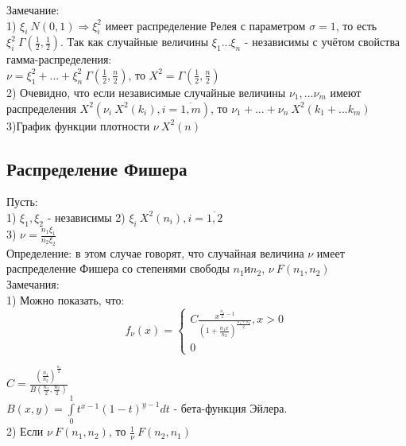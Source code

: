 Замечание:\\
1)  $\xi_{i} ~ N(0, 1) \Rightarrow \xi^{2}_{i}$ имеет распределение Релея с параметром $\sigma = 1$, то есть $\xi^{2}_{i} ~ \Gamma(\frac{1}{2}, \frac{1}{2})$. Так как случайные величины $\xi_{1} ... \xi_{n}$ - независимы с учётом свойства гамма-распределения:\\
$\nu = \xi_{1}^{2} + ... + \xi^{2}_{n} ~ \Gamma(\frac{1}{2}, \frac{n}{2})$, то $X^{2} = \Gamma(\frac{1}{2}, \frac{n}{2})$\\
2) Очевидно, что если независимые случайные величины $\nu_{1}, ... \nu_{m}$ имеют распределения $X^{2} (\nu_{i} ~ X^{2} (k_{i}), i=\overline{1, m})$, то $\nu_{1} + ... + \nu_{n} ~ X^{2}(k_{1} + ... k_{m})$\\
3)График функции плотности $\nu ~ X^{2}(n)$\\
\begin{figure}[H]
	\center{\texttt{[image: 5\_6]}}
\end{figure}

\subsection{Распределение Фишера}
Пусть:\\
1) $\xi_{1}, \xi_{2}$ - независимы
2) $\xi_{i} ~ X^{2}(n_{i}), i = \overline{1,2}$\\
3) $\nu = \frac{n_{1} \xi_{1}}{n_{2} \xi_{2}}$\\

Определение: в этом случае говорят, что случайная величина $\nu$ имеет распределение Фишера со степенями свободы $n_{1} и n_{2}$, $\nu ~ F(n_{1}, n_{2})$\\

Замечания:\\
1) Можно показать, что:\\
\begin{equation}
f_{\nu}(x) = 
\begin{cases}
C \frac{x^{\frac{n_{1}}{2} - 1}}{(1 + \frac{n_{1} x}{n_{2}})^{\frac{n_{1} + n_{2}}{2}}}, x > 0\\
0
\end{cases}
\end{equation}

$C = \frac{(\frac{n_{1}}{n_{2}})^{\frac{n_{1}}{2}}}{B(\frac{n_{1}}{2}, \frac{n_{2}}{2})}$\\
$B(x, y) = \int\limits_{0}^{1} t^{x - 1} (1 - t)^{y - 1} dt$  - бета-функция Эйлера.\\
2) Если $\nu ~ F(n_{1}, n_{2})$, то $\frac{1}{\nu} ~ F(n_{2}, n_{1})$\\









